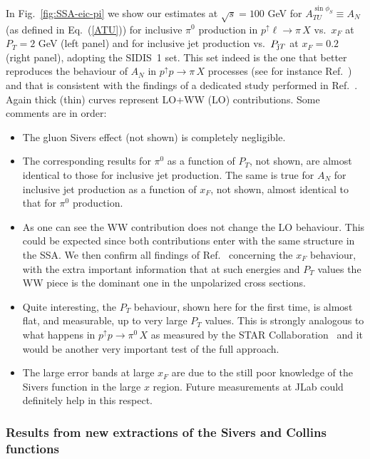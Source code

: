\documentclass[nofootinbib,superscriptaddress,aps]{revtex4}
\newcommand{\pup}{p^\uparrow}
\begin{document}
In Fig.~\ref{fig:SSA-eic-pi} we show our estimates at $\sqrt{s}= 100$  GeV for $A_{TU}^{\sin\phi_S} \equiv A_N$ (as defined in Eq.~(\ref{ATU})) for inclusive $\pi^0$ production in $p^\uparrow \ell \to \pi\, X$ vs.~$x_F$ at $P_T = 2$ GeV (left panel) and for inclusive jet production vs.~$P_{{\rm j}T}$ at $x_F=0.2$ (right panel), adopting the SIDIS~1 set. This set indeed is the one that better reproduces the behaviour of $A_N$ in $\pup p\to\pi\,X$ processes (see for instance Ref.~\cite{Boglione:2007dm}) and that is consistent with the findings of a dedicated study performed in Ref.~\cite{Anselmino:2013rya}. Again thick (thin) curves represent LO+WW (LO) contributions. Some comments are in order:
\begin{itemize}
\item The gluon Sivers effect (not shown) is completely negligible.
\item The corresponding results for $\pi^0$ as a function of $P_T$, not shown, are almost identical to those for inclusive jet production. The same is true for $A_N$ for inclusive jet production as a function of $x_F$, not shown, almost identical to that for $\pi^0$ production.
\item As one can see the WW contribution does not change the LO behaviour. This could be expected since both contributions enter with the same structure in the SSA. We then confirm all findings of Ref.~\cite{Anselmino:2014eza} concerning the $x_F$ behaviour, with the extra important information that at such energies and $P_T$ values the WW piece is the dominant one in the unpolarized cross sections.
\item Quite interesting, the $P_T$ behaviour, shown here for the first time, is almost flat, and measurable, up to very large $P_T$ values. This is strongly analogous to what happens in $p^\uparrow p\to \pi^0 \, X$ as measured by the STAR Collaboration~\cite{Igo:2012} and it would be another very important test of the full approach.
\item The large error bands at large $x_F$ are due to the still poor knowledge of the Sivers function in the large $x$ region. Future measurements at JLab could definitely help in this respect.
\end{itemize}



\subsubsection{Results from new extractions of the Sivers and Collins functions}
\end{document}
